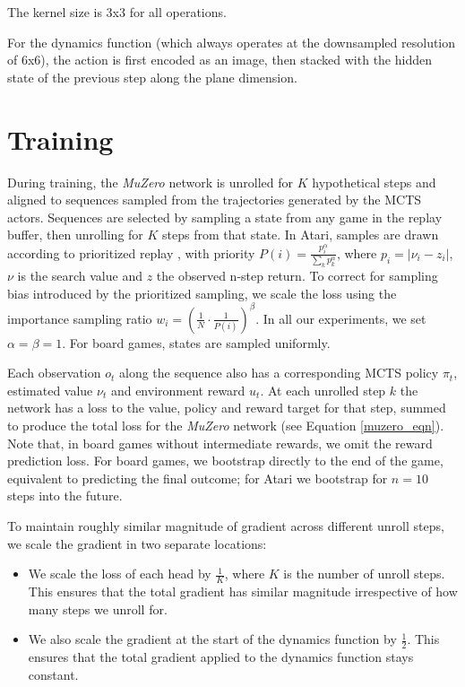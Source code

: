 \documentclass{article}
\newcommand{\muzero}{\emph{MuZero}}
\begin{document}
\begin{appendices}
The kernel size is 3x3 for all operations.

For the dynamics function (which always operates at the downsampled resolution of 6x6), the action is first encoded as an image, then stacked with the hidden state of the previous step along the plane dimension.


\section{Training}

During training, the \muzero{} network is unrolled for $K$ hypothetical steps and aligned to sequences sampled from the trajectories generated by the MCTS actors. Sequences are selected by sampling a state from any game in the replay buffer, then unrolling for $K$ steps from that state. In Atari, samples are drawn according to prioritized replay \cite{Schaul2016}, with priority $P(i) = \frac{p_i^\alpha}{\sum_k{p_k^\alpha}}$, where $p_i = |\nu_i - z_i|$, $\nu$ is the search value and $z$ the observed n-step return. To correct for sampling bias introduced by the prioritized sampling, we scale the loss using the importance sampling ratio $w_i = (\frac{1}{N} \cdot \frac{1}{P(i)})^\beta$. In all our experiments, we set $\alpha = \beta = 1$. For board games, states are sampled uniformly.

Each observation $o_t$ along the sequence also has a corresponding MCTS policy $\pi_t$, estimated value $\nu_t$ and environment reward $u_t$. At each unrolled step $k$ the network has a loss to the value, policy and reward target for that step, summed to produce the total loss for the \muzero{} network (see Equation \ref{muzero_eqn}). Note that, in board games without intermediate rewards, we omit the reward prediction loss. For board games, we bootstrap directly to the end of the game, equivalent to predicting the final outcome; for Atari we bootstrap for $n=10$ steps into the future.

To maintain roughly similar magnitude of gradient across different unroll steps, we scale the gradient in two separate locations:

\begin{itemize}
\item We scale the loss of each head by $\frac{1}{K}$, where $K$ is the number
      of unroll steps. This ensures that the total gradient has similar magnitude
      irrespective of how many steps we unroll for.
\item We also scale the gradient at the start of the dynamics function by
      $\frac{1}{2}$. This ensures that the total gradient applied to the
      dynamics function stays constant.
\end{itemize}


\end{appendices}
\end{document}
